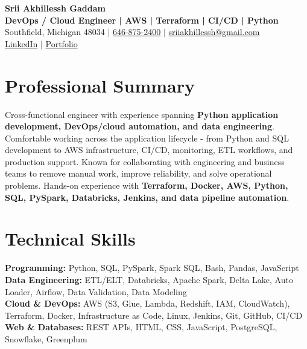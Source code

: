 \documentclass[letterpaper,10pt]{article}
\begin{document}
\fontsize{9.35pt}{10.45pt}\selectfont

\begin{center}
    {\LARGE \textbf{Srii Akhillessh Gaddam}} \\[-1pt]
    \textbf{DevOps / Cloud Engineer | AWS | Terraform | CI/CD | Python} \\[2pt]
    Southfield, Michigan 48034 $|$
    \href{tel:6468752400}{646-875-2400} $|$
    \href{mailto:sriiakhillessh@gmail.com}{sriiakhillessh@gmail.com} \\[1pt]
    \href{https://www.linkedin.com/in/srii-akhiilessh-gaddam-b48668191/}{LinkedIn} $|$
    \href{https://sriiakhillesshg.github.io/portfolio/}{Portfolio}
\end{center}
\vspace{-8pt}

\section{Professional Summary}
\small{Cross-functional engineer with experience spanning \textbf{Python application development, DevOps/cloud automation, and data engineering}. Comfortable working across the application lifecycle - from Python and SQL development to AWS infrastructure, CI/CD, monitoring, ETL workflows, and production support. Known for collaborating with engineering and business teams to remove manual work, improve reliability, and solve operational problems. Hands-on experience with \textbf{Terraform, Docker, AWS, Python, SQL, PySpark, Databricks, Jenkins, and data pipeline automation}.}

\section{Technical Skills}
\small{
\textbf{Programming:} Python, SQL, PySpark, Spark SQL, Bash, Pandas, JavaScript \\
\textbf{Data Engineering:} ETL/ELT, Databricks, Apache Spark, Delta Lake, Auto Loader, Airflow, Data Validation, Data Modeling \\
\textbf{Cloud \& DevOps:} AWS (S3, Glue, Lambda, Redshift, IAM, CloudWatch), Terraform, Docker, Infrastructure as Code, Linux, Jenkins, Git, GitHub, CI/CD \\
\textbf{Web \& Databases:} REST APIs, HTML, CSS, JavaScript, PostgreSQL, Snowflake, Greenplum
}
\end{document}
